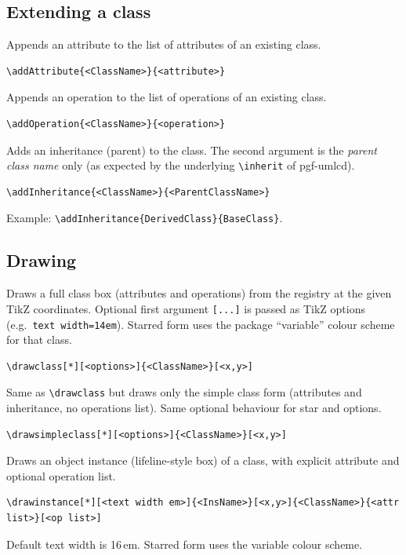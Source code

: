 \documentclass[11pt,a4paper]{article}
\begin{document}
\subsection{Extending a class}

\DescribeMacro{\addAttribute}
Appends an attribute to the list of attributes of an existing class.
\begin{verbatim}
\addAttribute{<ClassName>}{<attribute>}
\end{verbatim}

\DescribeMacro{\addOperation}
Appends an operation to the list of operations of an existing class.
\begin{verbatim}
\addOperation{<ClassName>}{<operation>}
\end{verbatim}

\DescribeMacro{\addInheritance}
Adds an inheritance (parent) to the class. The second argument is the
\emph{parent class name} only (as expected by the underlying
\texttt{\textbackslash inherit} of pgf-umlcd).
\begin{verbatim}
\addInheritance{<ClassName>}{<ParentClassName>}
\end{verbatim}
Example: \texttt{\textbackslash addInheritance\{DerivedClass\}\{BaseClass\}}.

\subsection{Drawing}

\DescribeMacro{\drawclass}
Draws a full class box (attributes and operations) from the registry at the
given TikZ coordinates. Optional first argument \texttt{[...]} is passed as
TikZ options (e.g.\ \texttt{text width=14em}). Starred form uses the package
``variable'' colour scheme for that class.
\begin{verbatim}
\drawclass[*][<options>]{<ClassName>}[<x,y>]
\end{verbatim}

\DescribeMacro{\drawsimpleclass}
Same as \texttt{\textbackslash drawclass} but draws only the simple class form
(attributes and inheritance, no operations list). Same optional behaviour for
star and options.
\begin{verbatim}
\drawsimpleclass[*][<options>]{<ClassName>}[<x,y>]
\end{verbatim}

\DescribeMacro{\drawinstance}
Draws an object instance (lifeline-style box) of a class, with explicit
attribute and optional operation list.
\begin{verbatim}
\drawinstance[*][<text width em>]{<InsName>}[<x,y>]{<ClassName>}{<attr list>}[<op list>]
\end{verbatim}
Default text width is 16\,em. Starred form uses the variable colour scheme.
\end{document}

